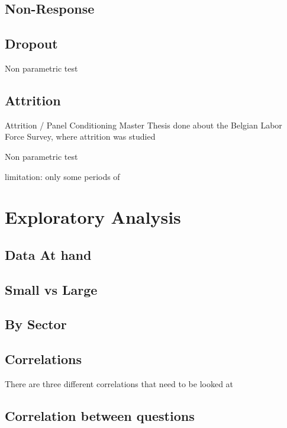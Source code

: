\documentclass[12pt,a4paper,oneside]{book}
\begin{document}
\section{Non-Response}



\section{Dropout}

Non parametric test \cite{das_nonparametric_2011}

\section{Attrition}
Attrition / Panel Conditioning 
Master Thesis done about the Belgian Labor Force Survey, where  attrition was studied \cite{priyana_hardjawidjaksana_investigating_2019}

Non parametric test \cite{das_nonparametric_2011}


limitation: only some periods of 


\chapter{Exploratory Analysis}


\section{Data At hand}


\section{Small vs Large}


\section{By Sector}

\section{Correlations}

There are three different correlations that need to be looked at

\section{Correlation between questions}
\end{document}
